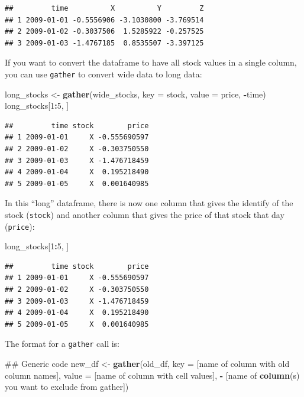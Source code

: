\documentclass[]{book}
\makeatletter
\newenvironment{Shaded}{\begin{snugshade}}{\end{snugshade}}
\newcommand{\KeywordTok}[1]{\textcolor[rgb]{0.13,0.29,0.53}{\textbf{#1}}}
\newcommand{\DataTypeTok}[1]{\textcolor[rgb]{0.13,0.29,0.53}{#1}}
\newcommand{\DecValTok}[1]{\textcolor[rgb]{0.00,0.00,0.81}{#1}}
\newcommand{\StringTok}[1]{\textcolor[rgb]{0.31,0.60,0.02}{#1}}
\newcommand{\OperatorTok}[1]{\textcolor[rgb]{0.81,0.36,0.00}{\textbf{#1}}}
\newcommand{\NormalTok}[1]{#1}
\newenvironment{kframe}{%
\medskip{}
\setlength{\fboxsep}{.8em}
 \def\at@end@of@kframe{}%
 \ifinner\ifhmode%
  \def\at@end@of@kframe{\end{minipage}}%
  \begin{minipage}{\columnwidth}%
 \fi\fi%
 \def\FrameCommand##1{\hskip\@totalleftmargin \hskip-\fboxsep
 \colorbox{shadecolor}{##1}\hskip-\fboxsep
     \hskip-\linewidth \hskip-\@totalleftmargin \hskip\columnwidth}%
 \MakeFramed {\advance\hsize-\width
   \@totalleftmargin\z@ \linewidth\hsize
   \@setminipage}}%
 {\par\unskip\endMakeFramed%
 \at@end@of@kframe}
\renewenvironment{Shaded}{\begin{kframe}}{\end{kframe}}
\theoremstyle{definition}
\theoremstyle{definition}
\theoremstyle{definition}
\theoremstyle{remark}
\makeatother
\begin{document}
\begin{verbatim}
##         time          X          Y         Z
## 1 2009-01-01 -0.5556906 -3.1030800 -3.769514
## 2 2009-01-02 -0.3037506  1.5285922 -0.257525
## 3 2009-01-03 -1.4767185  0.8535507 -3.397125
\end{verbatim}

If you want to convert the dataframe to have all stock values in a
single column, you can use \texttt{gather} to convert wide data to long
data:

\begin{Shaded}
\begin{Highlighting}[]
\NormalTok{long_stocks <-}\StringTok{ }\KeywordTok{gather}\NormalTok{(wide_stocks, }\DataTypeTok{key =}\NormalTok{ stock,}
                      \DataTypeTok{value =}\NormalTok{ price, }\OperatorTok{-}\NormalTok{time)}
\NormalTok{long_stocks[}\DecValTok{1}\OperatorTok{:}\DecValTok{5}\NormalTok{, ]}
\end{Highlighting}
\end{Shaded}

\begin{verbatim}
##         time stock        price
## 1 2009-01-01     X -0.555690597
## 2 2009-01-02     X -0.303750550
## 3 2009-01-03     X -1.476718459
## 4 2009-01-04     X  0.195218490
## 5 2009-01-05     X  0.001640985
\end{verbatim}

In this ``long'' dataframe, there is now one column that gives the
identify of the stock (\texttt{stock}) and another column that gives the
price of that stock that day (\texttt{price}):

\begin{Shaded}
\begin{Highlighting}[]
\NormalTok{long_stocks[}\DecValTok{1}\OperatorTok{:}\DecValTok{5}\NormalTok{, ]}
\end{Highlighting}
\end{Shaded}

\begin{verbatim}
##         time stock        price
## 1 2009-01-01     X -0.555690597
## 2 2009-01-02     X -0.303750550
## 3 2009-01-03     X -1.476718459
## 4 2009-01-04     X  0.195218490
## 5 2009-01-05     X  0.001640985
\end{verbatim}

The format for a \texttt{gather} call is:

\begin{Shaded}
\begin{Highlighting}[]
\NormalTok{## Generic code}
\NormalTok{new_df <-}\StringTok{ }\KeywordTok{gather}\NormalTok{(old_df,}
                 \DataTypeTok{key =}\NormalTok{ [name of column with old column names],}
                 \DataTypeTok{value =}\NormalTok{ [name of column with cell values],}
                 \OperatorTok{-}\StringTok{ }\NormalTok{[name of }\KeywordTok{column}\NormalTok{(s) you want to }
\NormalTok{                    exclude from gather])}
\end{Highlighting}
\end{Shaded}
\end{document}
